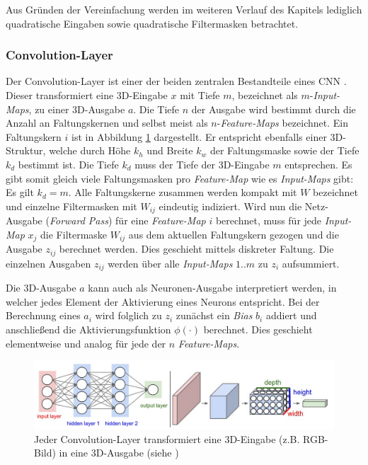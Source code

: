 Aus Gründen der Vereinfachung werden im weiteren Verlauf des Kapitels lediglich quadratische Eingaben sowie quadratische Filtermasken betrachtet.

\subsubsection{Convolution-Layer}
Der Convolution-Layer ist einer der beiden zentralen Bestandteile eines CNN \cite[vgl. hierzu und im Folgenden][]{LeCun1998}. 
Dieser transformiert eine 3D-Eingabe $x$ mit Tiefe $m$, bezeichnet als $m$-\textit{Input-Maps}, zu einer 3D-Ausgabe $a$. Die Tiefe $n$ der Ausgabe wird bestimmt durch die Anzahl an Faltungskernen und selbst meist als $n$-\textit{Feature-Maps} bezeichnet. Ein Faltungskern $i$ ist in Abbildung \ref{fig:3_cnn_kernel} dargestellt. Er entspricht ebenfalls einer 3D-Struktur, welche durch Höhe $k_h$ und Breite $k_w$ der Faltungsmaske sowie der Tiefe $k_d$ bestimmt ist. Die Tiefe $k_d$ muss der Tiefe der 3D-Eingabe $m$ entsprechen. Es gibt somit gleich viele Faltungsmasken pro \textit{Feature-Map} wie es \textit{Input-Maps} gibt: Es gilt $k_d=m$. Alle Faltungskerne zusammen werden kompakt mit $W$ bezeichnet und einzelne Filtermasken mit $W_{ij}$ eindeutig indiziert.
Wird nun die Netz-Ausgabe (\textit{Forward Pass}) für eine \textit{Feature-Map} $i$ berechnet, muss für jede \textit{Input-Map} $x_j$ die Filtermaske $W_{ij}$ aus dem aktuellen Faltungskern gezogen und die Ausgabe $z_{ij}$ berechnet werden. Dies geschieht mittels diskreter Faltung. Die einzelnen Ausgaben $z_{ij}$ werden über alle \textit{Input-Maps} $1..m$ zu $z_i$ aufsummiert.

Die 3D-Ausgabe $a$ kann auch als Neuronen-Ausgabe interpretiert werden, in welcher jedes Element der Aktivierung eines Neurons entspricht. Bei der Berechnung eines $a_i$ wird folglich zu $z_i$ zunächst ein \textit{Bias} $b_i$ addiert und anschließend die Aktivierungsfunktion $\phi(\cdot)$ berechnet. Dies geschieht elementweise und analog für jede der $n$ \textit{Feature-Maps}.

\begin{figure}[H]
\centering
\includegraphics[width=0.95\linewidth]{images/3_cnn_kernel}
\caption[Jeder Convolution-Layer transformiert eine 3D-Eingabe (z.B. RGB-Bild) in eine 3D-Ausgabe]{Jeder Convolution-Layer transformiert eine 3D-Eingabe (z.B. RGB-Bild) in eine 3D-Ausgabe (siehe \cite{Kaparthy2014})}
\label{fig:3_cnn_kernel}
\end{figure}

